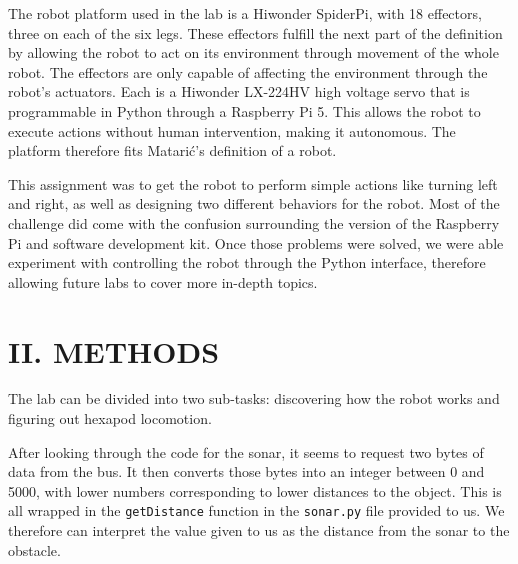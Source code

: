 \documentclass[11pt]{article}
\begin{document}
The robot platform used in the lab is a Hiwonder SpiderPi, with 18 effectors, three on each of the six legs. These effectors fulfill the next part of the definition by allowing the robot to act on its environment through movement of the whole robot. The effectors are only capable of affecting the environment through the robot's actuators. Each is a Hiwonder LX-224HV high voltage servo that is programmable in Python through a Raspberry Pi 5. This allows the robot to execute actions without human intervention, making it autonomous. The platform therefore fits Matarić's definition of a robot.

This assignment was to get the robot to perform simple actions like turning left and right, as well as designing two different behaviors for the robot. Most of the challenge did come with the confusion surrounding the version of the Raspberry Pi and software development kit. Once those problems were solved, we were able experiment with controlling the robot through the Python interface, therefore allowing future labs to cover more in-depth topics.

\section*{II. METHODS}

The lab can be divided into two sub-tasks: discovering how the robot works and figuring out hexapod locomotion. 

After looking through the code for the sonar, it seems to request two bytes of data from the bus. It then converts those bytes into an integer between 0 and 5000, with lower numbers corresponding to lower distances to the object. This is all wrapped in the \lstinline{getDistance} function in the \lstinline{sonar.py} file provided to us. We therefore can interpret the value given to us as the distance from the sonar to the obstacle.
\end{document}
